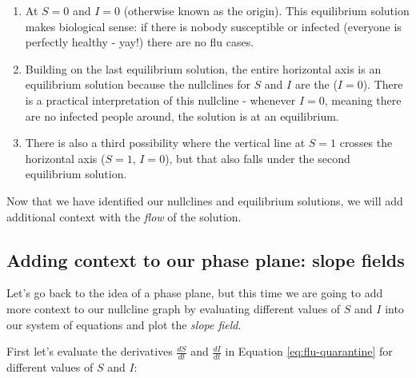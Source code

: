 \documentclass[
]{book}
\providecommand{\tightlist}{%
  \setlength{\itemsep}{0pt}\setlength{\parskip}{0pt}}
\theoremstyle{definition}
\theoremstyle{definition}
\theoremstyle{definition}
\theoremstyle{remark}
\begin{document}
\begin{enumerate}
\def\labelenumi{\arabic{enumi}.}
\tightlist
\item
  At \(S=0\) and \(I=0\) (otherwise known as the origin). This equilibrium solution makes biological sense: if there is nobody susceptible or infected (everyone is perfectly healthy - yay!) there are no flu cases.
\item
  Building on the last equilibrium solution, the entire horizontal axis is an equilibrium solution because the nullclines for \(S\) and \(I\) are the (\(I=0\)). There is a practical interpretation of this nullcline - whenever \(I=0\), meaning there are no infected people around, the solution is at an equilibrium.
\item
  There is also a third possibility where the vertical line at \(S=1\) crosses the horizontal axis (\(S=1\), \(I=0\)), but that also falls under the second equilibrium solution.
\end{enumerate}

Now that we have identified our nullclines and equilibrium solutions, we will add additional context with the \emph{flow} of the solution.

\hypertarget{adding-context-to-our-phase-plane-slope-fields}{%
\subsection{Adding context to our phase plane: slope fields}\label{adding-context-to-our-phase-plane-slope-fields}}

Let's go back to the idea of a phase plane, but this time we are going to add more context to our nullcline graph by evaluating different values of \(S\) and \(I\) into our system of equations and plot the \emph{slope field}.

First let's evaluate the derivatives \(\displaystyle \frac{dS}{dt}\) and \(\displaystyle \frac{dI}{dt}\) in Equation \eqref{eq:flu-quarantine} for different values of \(S\) and \(I\):
\end{document}
